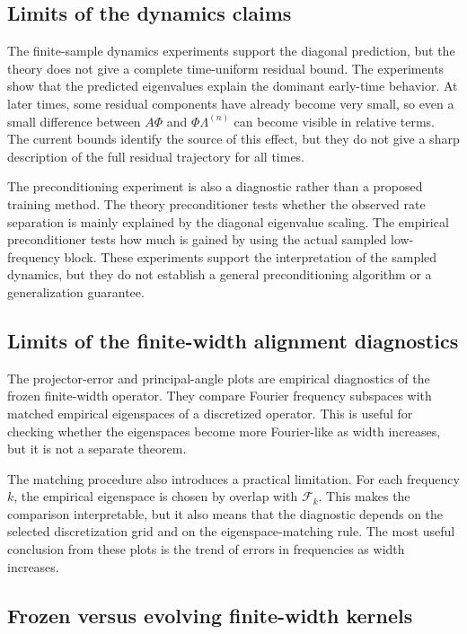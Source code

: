 \subsection{Limits of the dynamics claims}
\label{subsec:discussion-limitations-dynamics}

The finite-sample dynamics experiments support the diagonal prediction, but the
theory does not give a complete time-uniform residual bound. The experiments
show that the predicted eigenvalues explain the dominant early-time behavior.
At later times, some residual components have already become very small, so even
a small difference between \(A\Phi\) and \(\Phi\Lambda^{(n)}\) can become visible
in relative terms. The current bounds identify the source of this effect, but
they do not give a sharp description of the full residual trajectory for all
times.

The preconditioning experiment is also a diagnostic rather than a proposed
training method. The theory preconditioner tests whether the observed rate
separation is mainly explained by the diagonal eigenvalue scaling. The empirical
preconditioner tests how much is gained by using the actual sampled
low-frequency block. These experiments support the interpretation of the
sampled dynamics, but they do not establish a general preconditioning algorithm
or a generalization guarantee.

\subsection{Limits of the finite-width alignment diagnostics}
\label{subsec:discussion-limitations-alignment}

The projector-error and principal-angle plots are empirical diagnostics of the
frozen finite-width operator. They compare Fourier frequency subspaces with
matched empirical eigenspaces of a discretized operator. This is useful for
checking whether the eigenspaces become more Fourier-like as width increases,
but it is not a separate theorem.

The matching procedure also introduces a practical limitation. For each
frequency \(k\), the empirical eigenspace is chosen by overlap with
\(\mathcal F_k\). This makes the comparison interpretable, but it also means
that the diagnostic depends on the selected discretization grid and on the
eigenspace-matching rule. The most useful conclusion from these plots is the trend
of errors in frequencies as width increases.

\subsection{Frozen versus evolving finite-width kernels}
\label{subsec:discussion-limitations-evolving}

